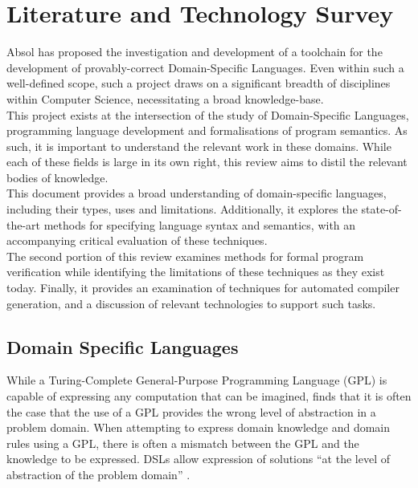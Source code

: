 \chapter{Literature and Technology Survey} %
\label{cha:literature_and_technology_survey}
Absol has proposed the investigation and development of a toolchain for the development of provably-correct Domain-Specific Languages. 
Even within such a well-defined scope, such a project draws on a significant breadth of disciplines within Computer Science, necessitating a broad knowledge-base.\\

This project exists at the intersection of the study of Domain-Specific Languages, programming language development and formalisations of program semantics. 
As such, it is important to understand the relevant work in these domains. 
While each of these fields is large in its own right, this review aims to distil the relevant bodies of knowledge. \\

This document provides a broad understanding of domain-specific languages, including their types, uses and limitations.
Additionally, it explores the state-of-the-art methods for specifying language syntax and semantics, with an accompanying critical evaluation of these techniques.\\

The second portion of this review examines methods for formal program verification while identifying the limitations of these techniques as they exist today. 
Finally, it provides an examination of techniques for automated compiler generation, and a discussion of relevant technologies to support such tasks. 

\section{Domain Specific Languages} %
\label{sec:domain_specific_languages}

While a Turing-Complete General-Purpose Programming Language (GPL) is capable of expressing any computation that can be imagined, \citet{fowler2010domain} finds that it is often the case that the use of a GPL provides the wrong level of abstraction in a problem domain.
When attempting to express domain knowledge and domain rules using a GPL, there is often a mismatch between the GPL and the knowledge to be expressed. 
DSLs allow expression of solutions ``at the level of abstraction of the problem domain'' \citep{van2000domain}.\\

